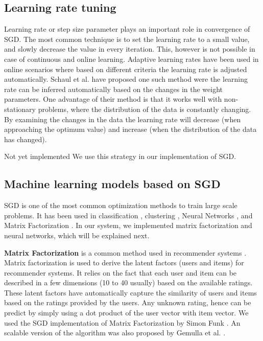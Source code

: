 \documentclass{sig-alternate-05-2015}
\begin{document}
\subsection{Learning rate tuning} \label{learning-rate}
Learning rate or step size parameter plays an important role in convergence of SGD.
The most common technique is to set the learning rate to a small value, and slowly decrease the value in every iteration. 
This, however is not possible in case of continuous and online learning. 
Adaptive learning rates have been used in online scenarios where based on different criteria the learning rate is adjusted automatically.
Schaul et al. \cite{schaul2013no} have proposed one such method were the learning rate can be inferred automatically based on the changes in the weight parameters. 
One advantage of their method is that it works well with non-stationary problems, where the distribution of the data is constantly changing. 
By examining the changes in the data the learning rate will decrease (when approaching the optimum value) and increase (when the distribution of the data has changed).
 
{\color{red}Not yet implemented}
We use this strategy in our implementation of SGD. 


\subsection{Machine learning models based on SGD}
SGD is one of the most common optimization methods to train large scale problems. 
It has been used in classification \cite{zhang2004solving}, clustering \cite{bottou1995convergence}, Neural Networks \cite{dean2012large}, and Matrix Factorization \cite{funk2006netflix}.
In our system, we implemented matrix factorization and neural networks, which will be explained next. 

\textbf{Matrix Factorization} is a common method used in recommender systems \cite{koren2009matrix}. 
Matrix factorization is used to derive the latent factors (users and items) for recommender systems.
It relies on the fact that each user and item can be described in a few dimensions (10 to 40 usually) based on the available ratings.
These latent factors have automatically capture the similarity of users and items based on the ratings provided by the users.
Any unknown rating, hence can be predict by simply using a dot product of the user vector with item vector.
We used the SGD implementation of Matrix Factorization by Simon Funk \cite{funk2006netflix}. 
An scalable version of the algorithm was also proposed by Gemulla et al. \cite{gemulla2011large}.
\end{document}
